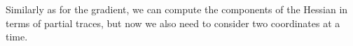 \documentclass[aos]{imsart}
\theoremstyle{definition}
\numberwithin{equation}{section}
\DeclareMathOperator{\tr}{Tr}
\newcommand{\ot}{\otimes}
\begin{document}
Similarly as for the gradient, we can compute the components of the Hessian in terms of partial traces, but now we also need to consider two coordinates at a time.

\end{document}
